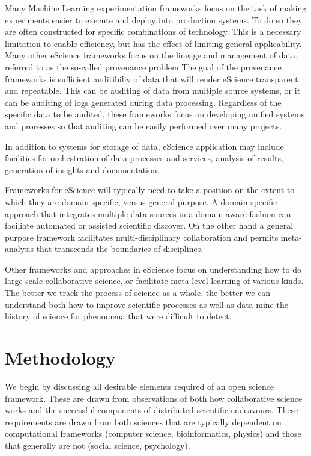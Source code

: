 \documentclass[sigconf]{acmart}
\begin{document}
Many Machine Learning experimentation frameworks focus on the task of making experiments
easier to execute and deploy into production systems\cite{Alberti:2018,MolnerDomenech:2020}. 
To do so they are often constructed for specific combinations of technology. This is a necessary limitation 
to enable efficiency, but has the effect of limiting general applicability.
Many other eScience frameworks focus on the lineage and management of data, referred to as 
the so-called provenance problem \cite{Sahoo:2008,Conquest:2021}
The goal of the provenance frameworks is sufficient auditibiliy of data that will 
render eScience transparent and repeatable. This can be auditing of data from multiple source systems,
or it can be auditing of logs generated during data processing\cite{Ferdous2020}. Regardless of the
specific data to be audited, these frameworks focus on developing unified systems and processes so
that auditing can be easily performed over many projects.

In addition to systems for storage of data, eScience application may include facilities for orchestration
of data processes and services\cite{Subramanian2013}, analysis of results, generation of insights
and documentation. 

Frameworks for eScience will typically need to take a position on the extent to which they are domain
specific, versus general purpose. A domain specific approach that integrates multiple data sources in
a domain aware fashion can faciliate automated or assisted scientific discover\cite{Howe2008}. On the
other hand a general purpose framework facilitates multi-disciplinary collaboration and permits meta-analysis
that transcends the boundaries of disciplines.

Other frameworks and approaches in eScience focus on understanding how to do large scale collaborative science, or
facilitate meta-level learning of various kinds\cite{Hunter:2005,Liu:2023}. The better we track the
process of science as a whole, the better we can understand both how to improve scientific processes
as well as data mine the history of science for phenomena that were difficult to detect.

\section{Methodology}

We begin by discussing all desirable elements required of an open science framework. These are drawn
from observations of both how collaborative science works and the successful components of distributed
scientific endeavours. These requirements are drawn from both sciences that are typically dependent
on computational frameworks (computer science, bioinformatics, physics) and those that generally are not
(social science, psychology).
\end{document}
